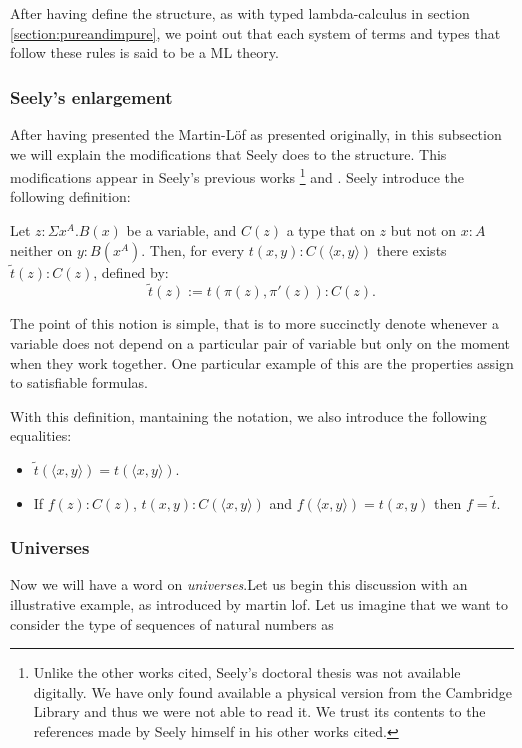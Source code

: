 \begin{remark}
  After having define the structure, as with typed lambda-calculus in section \ref{section:pureandimpure}, we point out that each system of terms and types that follow these rules is said to be a ML theory. 
\end{remark}
\subsubsection{Seely's enlargement}

After having presented the Martin-L\"of as presented originally, in this subsection we will explain the modifications that Seely does to the structure. This modifications appear in Seely's previous works \cite{seely1977hyperdoctrines}\footnote{Unlike the other works cited, Seely's doctoral thesis was not available digitally. We have only found available a physical version from the Cambridge Library and thus we were not able to read it. We trust its contents to the references made by Seely himself in his other works cited.} and \cite{seely1983hyperdoctrines}. Seely introduce the following definition:

\begin{definition}
  Let $z : \Sigma x^A.B(x)$ be a variable, and $C(z)$ a type that on $z$ but not on $x:A$ neither on $y:B(x^A)$. Then, for every $t(x,y) : C(\langle x, y\rangle)$ there exists $\tilde t (z) : C(z)$, defined by:
  $$\tilde t (z) := t(\pi(z),\pi'(z)): C(z).$$
\end{definition}

The point of this notion is simple, that is to more succinctly denote whenever a variable does not depend on a particular pair of variable but only on the moment when they work together. One particular example of this are the properties assign to satisfiable formulas.

With this definition, mantaining the notation, we also introduce the following equalities:
\begin{itemize}
\item $\tilde t(\langle x,y\rangle) = t(\langle x,y\rangle) $.
\item If $f(z): C(z)$, $t(x,y):C(\langle x,y\rangle)$ and $f(\langle x,y\rangle) = t(x,y)$ then $f=\tilde t$.

\end{itemize}


\subsubsection{Universes}
Now we will have a word on \emph{universes}.Let us begin this discussion with an illustrative example, as introduced by martin lof. Let us imagine that we want to consider the type of sequences of natural numbers as 

